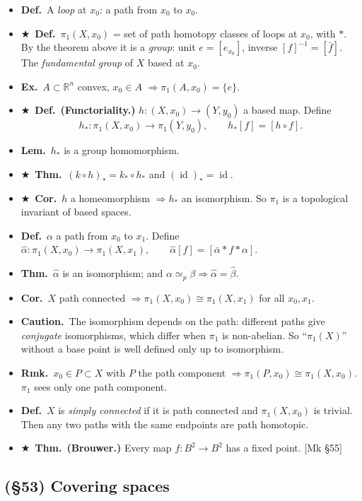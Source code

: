 \documentclass[12pt,a4paper]{article}
\newcommand{\Dfn}{\textbf{Def.}~}
\newcommand{\Thm}{\textbf{Thm.}~}
\newcommand{\Lem}{\textbf{Lem.}~}
\newcommand{\Cor}{\textbf{Cor.}~}
\newcommand{\Exa}{\textbf{Ex.}~}
\newcommand{\Rmk}{\textbf{Rmk.}~}
\newcommand{\Warn}{\textbf{Caution.}~}
\newcommand{\Key}{$\bigstar$~}                  %
\newcommand{\Mk}[1]{{\footnotesize\textcolor{cue}{[Mk #1]}}}  %
\newenvironment{BL}%
  {\begin{itemize}[leftmargin=1.4em,labelsep=0.55em,itemsep=11pt,topsep=11pt,parsep=0pt]}%
  {\end{itemize}}
\newcommand{\RR}{\mathbb{R}}
\DeclareMathOperator{\id}{id}
\newcommand{\imp}{\Rightarrow}
\begin{document}
\begin{BL}
\item \Dfn A \emph{loop} at $x_0$: a path from $x_0$ to $x_0$.
\item \Key\Dfn $\pi_1(X,x_0)$ = set of path homotopy classes of loops at $x_0$, with $*$.
      By the theorem above it is a \emph{group}: unit $e=[e_{x_0}]$, inverse $[f]^{-1}=[\bar f]$.
      The \emph{fundamental group} of $X$ based at $x_0$.
\item \Exa $A\subset\RR^n$ convex, $x_0\in A$ $\imp\pi_1(A,x_0)=\{e\}$.
\item \Key\Dfn \textbf{(Functoriality.)} $h\colon(X,x_0)\to(Y,y_0)$ a based map. Define
  \[ h_*\colon\pi_1(X,x_0)\to\pi_1(Y,y_0),\qquad h_*[f]=[h\circ f]. \]
\item \Lem $h_*$ is a group homomorphism.
\item \Key\Thm $(k\circ h)_*=k_*\circ h_*$ and $(\id)_*=\id$.
\item \Key\Cor $h$ a homeomorphism $\imp h_*$ an isomorphism.
      So $\pi_1$ is a topological invariant of based spaces.
\item \Dfn $\alpha$ a path from $x_0$ to $x_1$. Define
      \(\hat\alpha\colon\pi_1(X,x_0)\to\pi_1(X,x_1),\qquad\hat\alpha[f]=[\bar\alpha*f*\alpha].\)
\item \Thm $\hat\alpha$ is an isomorphism; and $\alpha\simeq_p\beta\imp\hat\alpha=\hat\beta$.
\item \Cor $X$ path connected $\imp\pi_1(X,x_0)\cong\pi_1(X,x_1)$ for all $x_0,x_1$.
\item \Warn The isomorphism depends on the path: different paths give \emph{conjugate}
      isomorphisms, which differ when $\pi_1$ is non-abelian. So ``$\pi_1(X)$'' without a base
      point is well defined only up to isomorphism.
\item \Rmk $x_0\in P\subset X$ with $P$ the path component $\imp\pi_1(P,x_0)\cong\pi_1(X,x_0)$.
      $\pi_1$ sees only one path component.
\item \Dfn $X$ is \emph{simply connected} if it is path connected and $\pi_1(X,x_0)$ is trivial.
      Then any two paths with the same endpoints are path homotopic.
\item \Key\Thm \textbf{(Brouwer.)} Every map $f\colon B^2\to B^2$ has a fixed point. \Mk{\S55}
\end{BL}

\subsection{(\S53) Covering spaces}
\end{document}
